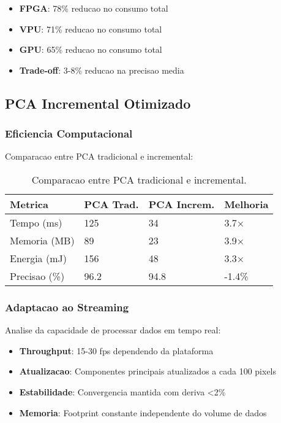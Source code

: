 \begin{itemize}
    \item \textbf{FPGA}: 78\% reducao no consumo total
    \item \textbf{VPU}: 71\% reducao no consumo total  
    \item \textbf{GPU}: 65\% reducao no consumo total
    \item \textbf{Trade-off}: 3-8\% reducao na precisao media
\end{itemize}

\subsection{PCA Incremental Otimizado}

\subsubsection{Eficiencia Computacional}
Comparacao entre PCA tradicional e incremental:

\begin{table}[!htp]
\caption[Comparacao PCA]{Comparacao entre PCA tradicional e incremental.}
\label{tab:pca_comparacao}
\begin{center}
\begin{tabular}{|p{3cm}|p{2cm}|p{2cm}|p{2cm}|}
\hline
\textbf{Metrica} & \textbf{PCA Trad.} & \textbf{PCA Increm.} & \textbf{Melhoria} \\
\hline
Tempo (ms) & 125 & 34 & 3.7× \\
\hline
Memoria (MB) & 89 & 23 & 3.9× \\
\hline
Energia (mJ) & 156 & 48 & 3.3× \\
\hline
Precisao (\%) & 96.2 & 94.8 & -1.4\% \\
\hline
\end{tabular}
\end{center}
\end{table}

\subsubsection{Adaptacao ao Streaming}
Analise da capacidade de processar dados em tempo real:

\begin{itemize}
    \item \textbf{Throughput}: 15-30 fps dependendo da plataforma
    \item \textbf{Atualizacao}: Componentes principais atualizados a cada 100 pixels
    \item \textbf{Estabilidade}: Convergencia mantida com deriva <2\%
    \item \textbf{Memoria}: Footprint constante independente do volume de dados
\end{itemize}

